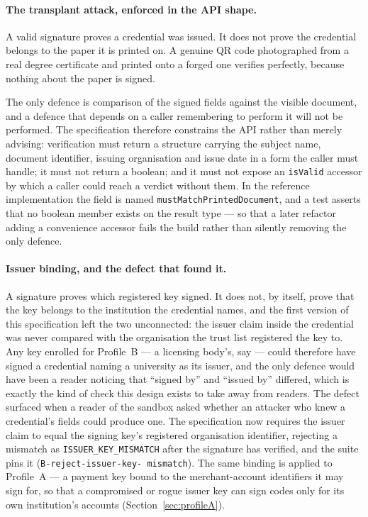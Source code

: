 \documentclass[10pt,a4paper,twocolumn]{article}
\newcommand{\code}[1]{\texttt{\small #1}}
\begin{document}
\paragraph{The transplant attack, enforced in the API shape.}
\label{sec:transplant}
A valid signature proves a credential was issued. It does not prove the
credential belongs to the paper it is printed on. A genuine QR code photographed
from a real degree certificate and printed onto a forged one verifies perfectly,
because nothing about the paper is signed.

The only defence is comparison of the signed fields against the visible
document, and a defence that depends on a caller remembering to perform it will
not be performed. The specification therefore constrains the API rather than
merely advising: verification must return a structure carrying the subject name,
document identifier, issuing organisation and issue date in a form the caller
must handle; it must not return a boolean; and it must not expose an
\code{isValid} accessor by which a caller could reach a verdict without them. In
the reference implementation the field is named \code{mustMatchPrintedDocument},
and a test asserts that no boolean member exists on the result type --- so that a
later refactor adding a convenience accessor fails the build rather than
silently removing the only defence.

\paragraph{Issuer binding, and the defect that found it.} A signature proves
which registered key signed. It does not, by itself, prove that the key belongs
to the institution the credential names, and the first version of this
specification left the two unconnected: the issuer claim inside the credential
was never compared with the organisation the trust list registered the key to.
Any key enrolled for Profile~B --- a licensing body's, say --- could therefore
have signed a credential naming a university as its issuer, and the only
defence would have been a reader noticing that ``signed by'' and ``issued
by'' differed, which is exactly the kind of check this design exists to take
away from readers. The defect surfaced when a reader of the sandbox asked
whether an attacker who knew a credential's fields could produce one. The
specification now requires the issuer claim to equal the signing key's
registered organisation identifier, rejecting a mismatch as
\code{ISSUER\_KEY\_MISMATCH} after the signature has verified, and the suite
pins it (\code{B-reject-\allowbreak issuer-\allowbreak key-\allowbreak
mismatch}). The same binding is applied to Profile~A --- a payment key bound to the
merchant-account identifiers it may sign for, so that a compromised or rogue
issuer key can sign codes only for its own institution's accounts
(Section~\ref{sec:profileA}).
\end{document}
